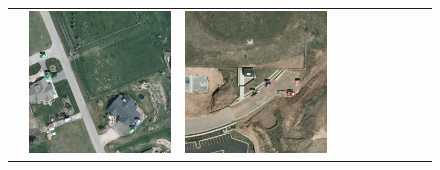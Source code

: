 \begin{figure}[h!]
\begin{tabularx}{\textwidth}{c|*{9}{X}}
    & \includegraphics[trim={230pt 200pt 680pt 725pt},clip,width=\linewidth]{images/015Results/01abb_vs_obb/comp_images/abb/509.png}
    & \includegraphics[trim={440pt 360pt 460pt 555pt},clip,width=\linewidth]{images/015Results/01abb_vs_obb/comp_images/abb/427.png}

\end{tabularx}
\end{figure}
